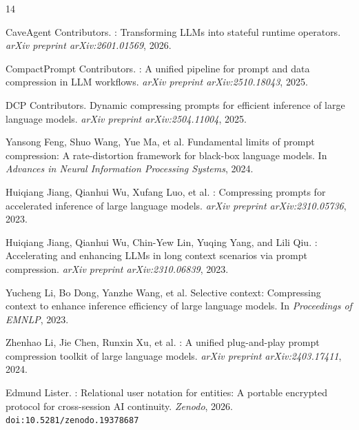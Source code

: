 \documentclass[11pt,a4paper]{article}
\begin{document}


\begin{thebibliography}{14}

CaveAgent Contributors.
: Transforming {LLMs} into stateful runtime operators.
\newblock \textit{arXiv preprint arXiv:2601.01569}, 2026.

CompactPrompt Contributors.
: A unified pipeline for prompt and data compression in {LLM} workflows.
\newblock \textit{arXiv preprint arXiv:2510.18043}, 2025.

DCP Contributors.
\newblock Dynamic compressing prompts for efficient inference of large language models.
\newblock \textit{arXiv preprint arXiv:2504.11004}, 2025.

Yansong Feng, Shuo Wang, Yue Ma, et al.
\newblock Fundamental limits of prompt compression: A rate-distortion framework for black-box language models.
\newblock In \textit{Advances in Neural Information Processing Systems}, 2024.

Huiqiang Jiang, Qianhui Wu, Xufang Luo, et al.
: Compressing prompts for accelerated inference of large language models.
\newblock \textit{arXiv preprint arXiv:2310.05736}, 2023.

Huiqiang Jiang, Qianhui Wu, Chin-Yew Lin, Yuqing Yang, and Lili Qiu.
: Accelerating and enhancing {LLMs} in long context scenarios via prompt compression.
\newblock \textit{arXiv preprint arXiv:2310.06839}, 2023.

Yucheng Li, Bo Dong, Yanzhe Wang, et al.
\newblock Selective context: Compressing context to enhance inference efficiency of large language models.
\newblock In \textit{Proceedings of EMNLP}, 2023.

Zhenhao Li, Jie Chen, Runxin Xu, et al.
: A unified plug-and-play prompt compression toolkit of large language models.
\newblock \textit{arXiv preprint arXiv:2403.17411}, 2024.

Edmund Lister.
: Relational user notation for entities: A portable encrypted protocol for cross-session {AI} continuity.
\newblock \textit{Zenodo}, 2026.
\newblock \texttt{doi:10.5281/zenodo.19378687}


\end{thebibliography}
\end{document}
